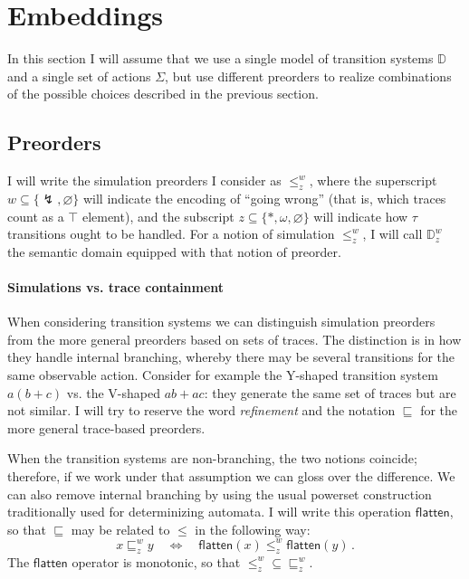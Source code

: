 \documentclass[11pt]{article}
\begin{document}


\section{Embeddings} %

In this section I will assume that we use
a single model of transition systems $\mathbb{D}$ and
a single set of actions $\Sigma$,
but use different preorders to
realize combinations of the possible choices
described in the previous section.

\subsection{Preorders} %

I will write the simulation preorders I consider as $\le^w_z$,
where the superscript $w \subseteq \{\lightning, \varnothing\}$ will indicate
the encoding of ``going wrong''
(that is, which traces count as a $\top$ element),
and the subscript $z \subseteq \{*, \omega, \varnothing\}$ will indicate
how $\tau$ transitions ought to be handled.
For a notion of simulation $\le^w_z$,
I will call $\mathbb{D}^w_z$
the semantic domain equipped with that notion of preorder.

\paragraph{Simulations vs. trace containment} %

When considering transition systems
we can distinguish simulation preorders
from the more general preorders based on sets of traces.
The distinction is in how they handle internal branching,
whereby there may be several transitions for the same observable action.
Consider for example
the Y-shaped transition system $a(b + c)$ vs.
the V-shaped $ab + ac$:
they generate the same set of traces but are not similar.
I will try to reserve the word \emph{refinement}
and the notation $\sqsubseteq$
for the more general trace-based preorders.

When the transition systems are non-branching,
the two notions coincide;
therefore, if we work under that assumption
we can gloss over the difference.
We can also remove internal branching by using the usual
powerset construction traditionally used for determinizing automata.
I will write this operation $\mathsf{flatten}$,
so that $\sqsubseteq$ may be related to $\le$ in the following way:
\[ x \sqsubseteq^w_z y \quad \Leftrightarrow \quad
  \mathsf{flatten}(x) \le^w_z \mathsf{flatten}(y) \,. \]
The $\mathsf{flatten}$ operator is monotonic, so that
${\le}^w_z \subseteq {\sqsubseteq}^w_z$.
\end{document}

